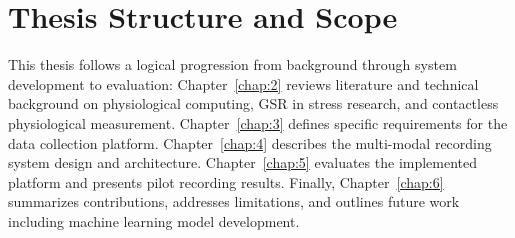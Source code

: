 \section{Thesis Structure and Scope}

This thesis follows a logical progression from background through system development to evaluation: Chapter~\ref{chap:2} reviews literature and technical background on physiological computing, GSR in stress research, and contactless physiological measurement. Chapter~\ref{chap:3} defines specific requirements for the data collection platform. Chapter~\ref{chap:4} describes the multi-modal recording system design and architecture. Chapter~\ref{chap:5} evaluates the implemented platform and presents pilot recording results. Finally, Chapter~\ref{chap:6} summarizes contributions, addresses limitations, and outlines future work including machine learning model development.